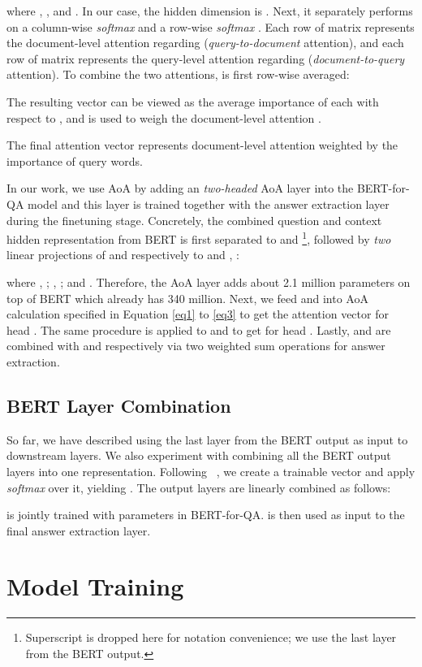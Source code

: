 \documentclass[letterpaper]{article} \usepackage{aaai20}  \usepackage{times}  \usepackage{helvet} \usepackage{courier}  \usepackage[hyphens]{url}  \usepackage{graphicx} \urlstyle{rm} \def\UrlFont{\rm}  \usepackage{graphicx}  \frenchspacing  \setlength{\pdfpagewidth}{8.5in}  \setlength{\pdfpageheight}{11in}  \usepackage{amsmath}
\newcommand{\citet}[1]{\citeauthor{#1}~\shortcite{#1}}
\begin{document}
where , , and . In our case, the hidden dimension is . Next, it separately performs on  a column-wise \emph{softmax}  and a row-wise \emph{softmax} . Each row  of matrix  represents the document-level attention regarding  (\emph{query-to-document} attention), and each row  of matrix  represents the query-level attention regarding  (\emph{document-to-query} attention). To combine the two attentions,  is first row-wise averaged:

The resulting vector can be viewed as the average importance of each  with respect to , and is used to weigh the document-level attention .

The final attention vector  represents document-level attention weighted by the importance of query words.

In our work, we use AoA by adding an \emph{two-headed} AoA layer into the BERT-for-QA model and this layer is trained together with the answer extraction layer during the finetuning stage. Concretely, the combined question and context hidden representation  from BERT is first separated to  and  \footnote{Superscript  is dropped here for notation convenience; we use the last layer  from the BERT output.}, followed by \emph{two} linear projections of  and  respectively to  and , :


where , ; , ; and . Therefore, the AoA layer adds about 2.1 million parameters on top of BERT which already has 340 million. Next, we feed  and  into AoA calculation specified in Equation \eqref{eq1} to \eqref{eq3} to get the attention vector  for head . The same procedure is applied to  and  to get  for head . Lastly,  and  are combined with  and  respectively via two weighted sum operations for answer extraction.

\subsection{BERT Layer Combination}
So far, we have described using the last layer from the BERT output  as input to downstream layers. We also experiment with combining all the BERT output layers into one representation. Following \citet{Peters_2018}, we create a trainable vector  and apply \emph{softmax} over it, yielding . The output layers are linearly combined as follows:

 is jointly trained with parameters in BERT-for-QA.  is then used as input to the final answer extraction layer.
 \section{Model Training}
\label{sec:training}
\end{document}
